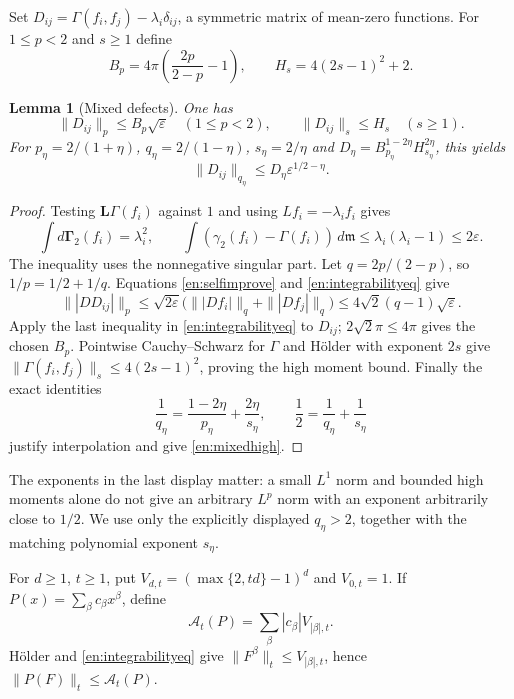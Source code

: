 \documentclass[12pt]{amsart}
\newtheorem{lem}[thm]{Lemma}
\theoremstyle{definition}
\theoremstyle{remark}
\numberwithin{equation}{section}
\newcommand{\dm}{\,d\mathfrak m}
\newcommand{\eps}{\varepsilon}
\theoremstyle{plain}
\begin{document}
Set $D_{ij}=\Gamma(f_i,f_j)-\lambda_i\delta_{ij}$, a symmetric matrix
of mean-zero functions. For $1\leq p<2$ and $s\geq1$ define
\begin{equation}\label{en:constantsB}
 B_p=4\pi\left(\frac{2p}{2-p}-1\right),\qquad
 H_s=4(2s-1)^2+2.
\end{equation}
\begin{lem}[Mixed defects]\label{en:mixed}
One has
\begin{equation}\label{en:mixedlow}
 \|D_{ij}\|_p\leq B_p\sqrt\eps\quad(1\leq p<2),\qquad
 \|D_{ij}\|_s\leq H_s\quad(s\geq1).
\end{equation}
For $p_\eta=2/(1+\eta)$, $q_\eta=2/(1-\eta)$,
$s_\eta=2/\eta$ and
$D_\eta=B_{p_\eta}^{1-2\eta}H_{s_\eta}^{2\eta}$, this yields
\begin{equation}\label{en:mixedhigh}
 \|D_{ij}\|_{q_\eta}\leq D_\eta\eps^{1/2-\eta}.
\end{equation}
\end{lem}
\begin{proof}
Testing $\boldsymbol L\Gamma(f_i)$ against $1$ and using
$Lf_i=-\lambda_i f_i$ gives
\[
 \int d\boldsymbol\Gamma_2(f_i)=\lambda_i^2,\qquad
 \int(\gamma_2(f_i)-\Gamma(f_i))\dm
 \leq\lambda_i(\lambda_i-1)\leq2\eps.
\]
The inequality uses the nonnegative singular part. Let
$q=2p/(2-p)$, so $1/p=1/2+1/q$. Equations
\eqref{en:selfimprove} and \eqref{en:integrabilityeq} give
\[
 \||DD_{ij}|\|_p
 \leq\sqrt{2\eps}\bigl(\||Df_i|\|_q+\||Df_j|\|_q\bigr)
 \leq4\sqrt2(q-1)\sqrt\eps.
\]
Apply the last inequality in \eqref{en:integrabilityeq} to $D_{ij}$;
$2\sqrt2\pi\leq4\pi$ gives the chosen $B_p$.
Pointwise Cauchy--Schwarz for $\Gamma$ and H\"older with exponent $2s$
give $\|\Gamma(f_i,f_j)\|_s\leq4(2s-1)^2$, proving the high moment bound.
Finally the exact identities
\[
 \frac1{q_\eta}=\frac{1-2\eta}{p_\eta}+
                  \frac{2\eta}{s_\eta},\qquad
 \frac12=\frac1{q_\eta}+\frac1{s_\eta}
\]
justify interpolation and give \eqref{en:mixedhigh}.
\end{proof}
The exponents in the last display matter: a small $L^1$ norm and bounded
high moments alone do not give an arbitrary $L^p$ norm with an exponent
arbitrarily close to $1/2$. We use only the explicitly displayed
$q_\eta>2$, together with the matching polynomial exponent $s_\eta$.

For $d\geq1$, $t\geq1$, put $V_{d,t}=(\max\{2,td\}-1)^d$ and
$V_{0,t}=1$. If $P(x)=\sum_\beta c_\beta x^\beta$, define
\begin{equation}\label{en:polynorm}
 \mathcal A_t(P)=\sum_\beta|c_\beta|V_{|\beta|,t}.
\end{equation}
H\"older and \eqref{en:integrabilityeq} give
$\|F^\beta\|_t\leq V_{|\beta|,t}$, hence
$\|P(F)\|_t\leq\mathcal A_t(P)$.
\end{document}
